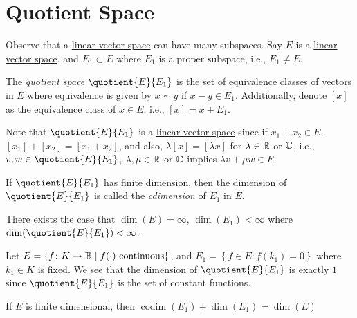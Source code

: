 \section{Quotient Space}
Observe that a \hyperref[def:linear-vector-space]{linear vector space} can have many subspaces. Say \(E\) is a \hyperref[def:linear-vector-space]{linear vector space}, and \(E_1 \subset E\) where \(E_1\) is a proper subspace, i.e., \(E_1 \neq E\).

\begin{definition}\label{def:quotient-space}
	The \emph{quotient space} \(\quotient{E}{E_1} \) is the set of equivalence classes of vectors in \(E\) where equivalence is given by \(x\sim y\) if \(x - y\in E_1\). Additionally, denote \([x]\) as the equivalence class of \(x\in E\), i.e., \([x] = x + E_1\).
\end{definition}

Note that \(\quotient{E}{E_1} \) is a \hyperref[def:linear-vector-space]{linear vector space} since if \(x_1 + x_2\in E\), \([x_1] + [x_2] = [x_1 + x_2]\), and also, \(\lambda [x] = [\lambda x]\) for \(\lambda \in \mathbb{\MakeUppercase{r}} \) or \(\mathbb{\MakeUppercase{c}} \), i.e., \(v, w\in \quotient{E}{E_1} \), \(\lambda , \mu \in\mathbb{\MakeUppercase{r}} \) or \(\mathbb{\MakeUppercase{c}} \) implies \(\lambda v + \mu w\in E\).

\begin{definition}[Codimension]\label{def:codimension}
	If \(\quotient{E}{E_1} \) has finite dimension, then the dimension of \(\quotient{E}{E_1} \) is called the \emph{cdimension} of \(E_1\) in \(E\).
\end{definition}

\begin{eg}
	There exists the case that \(\dim(E) = \infty \), \(\dim(E_1) < \infty\) where \(\dim(\quotient{E}{E_1} )<\infty \).
\end{eg}
\begin{explanation}
	Let \(E = \left\{ f\colon K\to \mathbb{\MakeUppercase{r}} \mid f(\cdot) \text{ continuous}  \right\} \), and \(E_1 = \left\{ f\in E\colon f(k_1) = 0 \right\} \) where \(k_1\in K\) is fixed. We see that the dimension of \(\quotient{E}{E_1} \) is exactly \(1\) since \(\quotient{E}{E_1} \) is the set of constant functions.
\end{explanation}

\begin{theorem}
	If \(E\) is finite dimensional, then \(\mathop{\mathrm{codim}}(E_1) + \dim (E_1) = \dim(E)\)
\end{theorem}

